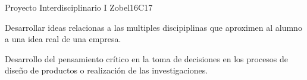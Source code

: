 \begin{syllabus}
\begin{unit}{Proyecto Interdisciplinario I }{}{Zobel}{16}{C17}
\begin{topics}
      \item Desarrollar ideas relacionas a las multiples discipiplinas  que aproximen al alumno a una idea real de una empresa.
\end{topics}

\begin{learningoutcomes}
   \item Desarrollo del pensamiento crítico en la toma de decisiones en los procesos de diseño de productos o realización de las investigaciones.
\end{learningoutcomes}
\end{unit}

\begin{coursebibliography}
\end{coursebibliography}

\end{syllabus}
